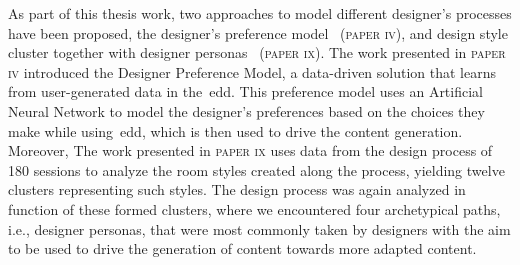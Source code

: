 As part of this thesis work, two approaches to model different designer's processes have been proposed, the designer's preference model~\cite{alvarez_learning_2020} (\textsc{paper iv}), and design style cluster together with designer personas~\cite{alvarez_designer_2022} (\textsc{paper ix}). The work presented in \textsc{paper iv} introduced the Designer Preference Model, a data-driven solution that learns from user-generated data in the~\acrshort{edd}. This preference model uses an Artificial Neural Network to model the designer's preferences based on the choices they make while using~\acrshort{edd}, which is then used to drive the content generation. Moreover, The work presented in \textsc{paper ix} uses data from the design process of 180 sessions to analyze the room styles created along the process, yielding twelve clusters representing such styles. The design process was again analyzed in function of these formed clusters, where we encountered four archetypical paths, i.e., designer personas, that were most commonly taken by designers with the aim to be used to drive the generation of content towards more adapted content. 








